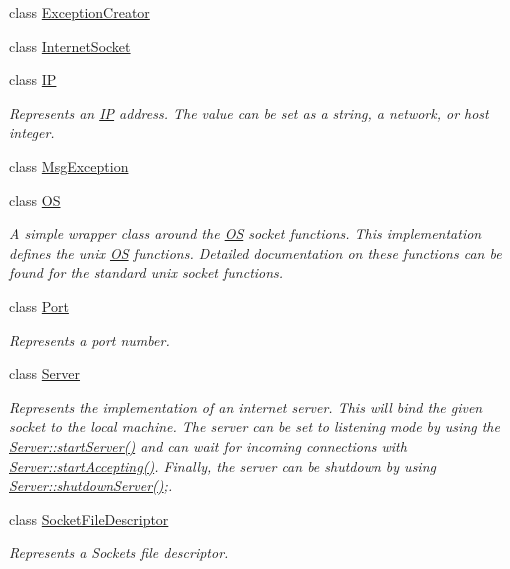 \begin{DoxyCompactItemize}
class \hyperlink{class_communication_1_1_exception_creator}{Exception\+Creator}
\item 
class \hyperlink{class_communication_1_1_internet_socket}{Internet\+Socket}
\item 
class \hyperlink{class_communication_1_1_i_p}{I\+P}
\begin{DoxyCompactList}\small\item\em Represents an \hyperlink{class_communication_1_1_i_p}{I\+P} address. The value can be set as a string, a network, or host integer. \end{DoxyCompactList}\item 
class \hyperlink{class_communication_1_1_msg_exception}{Msg\+Exception}
\item 
class \hyperlink{class_communication_1_1_o_s}{O\+S}
\begin{DoxyCompactList}\small\item\em A simple wrapper class around the \hyperlink{class_communication_1_1_o_s}{O\+S} socket functions. This implementation defines the unix \hyperlink{class_communication_1_1_o_s}{O\+S} functions. Detailed documentation on these functions can be found for the standard unix socket functions. \end{DoxyCompactList}\item 
class \hyperlink{class_communication_1_1_port}{Port}
\begin{DoxyCompactList}\small\item\em Represents a port number. \end{DoxyCompactList}\item 
class \hyperlink{class_communication_1_1_server}{Server}
\begin{DoxyCompactList}\small\item\em Represents the implementation of an internet server. This will bind the given socket to the local machine. The server can be set to listening mode by using the \hyperlink{class_communication_1_1_server_a30f8961c165145504a3c29410c0b643c}{Server\+::start\+Server()} and can wait for incoming connections with \hyperlink{class_communication_1_1_server_aa005d6dfbb2f3d09bb6f5c31c7f61563}{Server\+::start\+Accepting()}. Finally, the server can be shutdown by using \hyperlink{class_communication_1_1_server_a9d80054a0eb0a8f4935a766344f9e076}{Server\+::shutdown\+Server()};. \end{DoxyCompactList}\item 
class \hyperlink{class_communication_1_1_socket_file_descriptor}{Socket\+File\+Descriptor}
\begin{DoxyCompactList}\small\item\em Represents a Socket\textquotesingle{}s file descriptor. \end{DoxyCompactList}\item 

\end{DoxyCompactItemize}
